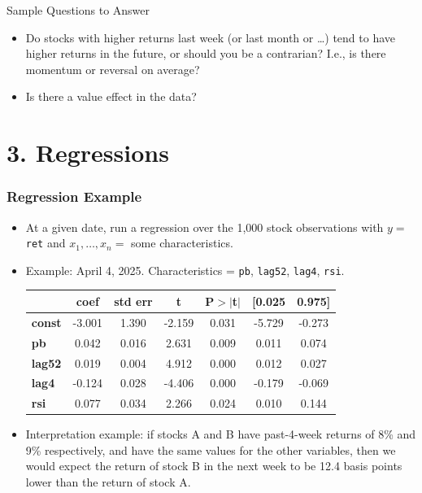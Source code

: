 \documentclass[10pt]{beamer}
\begin{document}
\begin{frame}{Sample Questions to Answer}
\begin{itemize}
    \item Do stocks with higher returns last week (or last month or \ldots) tend to have higher returns in the future, or should you be a contrarian?  I.e., is there momentum or reversal on average?
    \item Is there a value effect in the data?
\end{itemize}
\end{frame}

\section{3. Regressions}

\begin{frame}[fragile]\frametitle{Regression Example}
    \begin{itemize}
    \item At a given date, run a regression over the 1,000 stock observations with $y=$ \verb!ret! and $x_1, \ldots, x_n = $ some characteristics.
    \item Example: April 4, 2025.  Characteristics = \verb!pb!, \verb!lag52!, \verb!lag4!, \verb!rsi!.
   
    \vspace{1em}
    \begin{center}
        \begin{tabular}{lcccccc}
        \toprule
                       & \textbf{coef} & \textbf{std err} & \textbf{t} & \textbf{P$> |$t$|$} & \textbf{[0.025} & \textbf{0.975]}  \\
        \midrule
        \textbf{const} &      -3.001  &        1.390     &    -2.159  &         0.031        &       -5.729    &       -0.273     \\
        \textbf{pb}    &       0.042  &        0.016     &     2.631  &         0.009        &        0.011    &        0.074     \\
        \textbf{lag52} &       0.019  &        0.004     &     4.912  &         0.000        &        0.012    &        0.027     \\
        \textbf{lag4}  &      -0.124  &        0.028     &    -4.406  &         0.000        &       -0.179    &       -0.069     \\
        \textbf{rsi}   &       0.077  &        0.034     &     2.266  &         0.024        &        0.010    &        0.144     \\
        \bottomrule
        \end{tabular}
        \end{center}
        \vspace{1em}
    \item Interpretation example: if stocks A and B have past-4-week returns of 8\% and 9\% respectively, and have the same values for the other variables, then we would expect the return of stock B in the next week to be 12.4 basis points lower than the return of stock A.
    \end{itemize}
    \end{frame}
\end{document}

